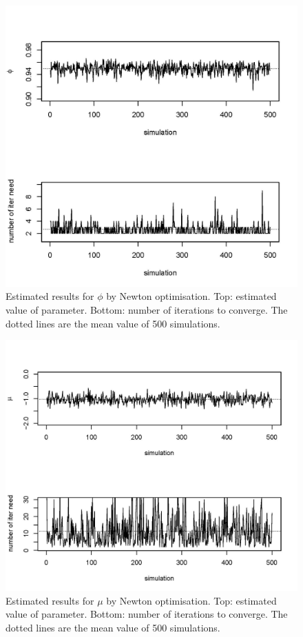 \documentclass[mstat,12pt]{unswthesis}  %
\numberwithin{equation}{section}
\begin{document}
\begin{figure}[H]
    \centering
    \includegraphics[width=1.0\linewidth]{scoremethod_phi.jpg}
    \caption
    {Estimated results for $\phi$ by Newton optimisation. Top: estimated value of parameter. Bottom:  number of iterations to converge. The dotted lines are the mean value of 500 simulations.}
    \label{fig:scoremethod_phi}
\end{figure}

\begin{figure}[H]
    \centering
    \includegraphics[width=1.0\linewidth]{scoremethod_mu.jpg}
    \caption
    {Estimated results for $\mu$ by Newton optimisation. Top: estimated value of parameter. Bottom:  number of iterations to converge. The dotted lines are the mean value of 500 simulations.}
    \label{fig:scoremethod_mu}
\end{figure}
\end{document}
